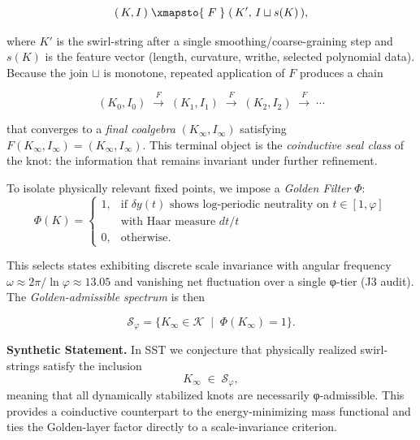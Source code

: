 \documentclass[10pt,reprint,aps,onecolumn,nofootinbib]{revtex4-2}
\begin{document}
    \[
        (\,K,I\,) \;\xmapsto{\;F\;}\; (\,K',\, I \sqcup s(K)\,),
    \]

    where \(K'\) is the swirl-string after a single smoothing/coarse-graining step
    and \(s(K)\) is the feature vector (length, curvature, writhe, selected polynomial data).
    Because the join \(\sqcup\) is monotone, repeated application of \(F\)
    produces a chain

    \[
        (K_0,I_0) \;\xrightarrow{F}\; (K_1,I_1)
        \;\xrightarrow{F}\; (K_2,I_2) \;\xrightarrow{F}\; \cdots
    \]

    that converges to a \emph{final coalgebra} \((K_\infty,I_\infty)\) satisfying
    \(F(K_\infty,I_\infty)=(K_\infty,I_\infty)\).
    This terminal object is the \emph{coinductive seal class} of the knot: the information
    that remains invariant under further refinement.

    \medskip

    \noindent
    To isolate physically relevant fixed points, we impose a
    \emph{Golden Filter} \(\Phi\):
    \[
        \Phi(K) =
        \begin{cases}
            1, & \text{if } \delta y(t) \text{ shows log-periodic neutrality on } t\!\in\![1,\varphi] \\
            & \text{with Haar measure } dt/t
            \\[4pt]
            0, & \text{otherwise.}
        \end{cases}
    \]

    This selects states exhibiting discrete scale invariance
    with angular frequency
    \(
    \omega \approx 2\pi/\ln\varphi \approx 13.05
    \)
    and vanishing net fluctuation over a single φ-tier (J3 audit).
    The \emph{Golden-admissible spectrum} is then

    \[
        \mathcal{S}_\varphi = \{K_\infty \in \mathcal{K} \;\mid\; \Phi(K_\infty)=1 \}.
    \]

    \medskip

    \noindent
    \textbf{Synthetic Statement.}
    In SST we conjecture that physically realized swirl-strings
    satisfy the inclusion
    \[
        K_\infty \;\in\; \mathcal{S}_\varphi,
    \]
    meaning that all dynamically stabilized knots are necessarily φ-admissible.
    This provides a coinductive counterpart to the energy-minimizing mass functional
    and ties the Golden-layer factor directly to a scale-invariance criterion.

    \medskip
\end{document}
